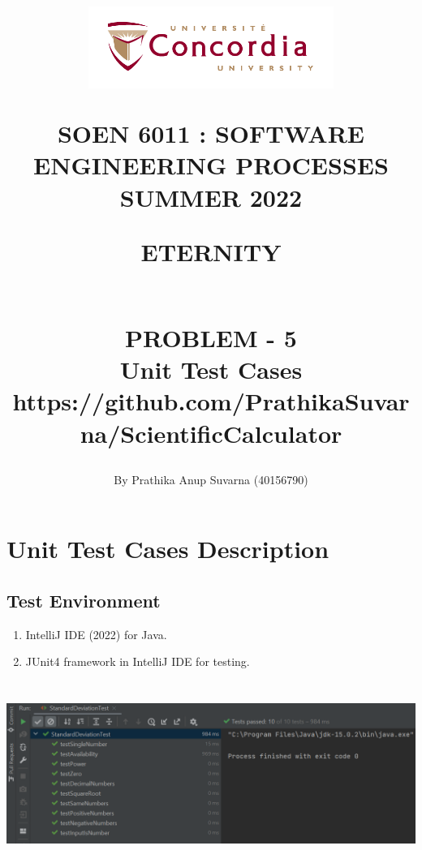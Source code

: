 \documentclass[12pt,letterpaper]{report}
\begin{document}
\title{\begin{figure}[htb]
\begin{center}
\includegraphics[width=8cm]{univ_logo}
\end{center}
\end{figure}SOEN 6011 : SOFTWARE ENGINEERING PROCESSES\\[.5em]
SUMMER 2022\\\vspace*{0.9in}
\begin{Large}
\textbf{ETERNITY} 
\end{Large}
\vspace*{0.7in}
\begin{Large}
\textbf{\\PROBLEM - 5} 
\\Unit Test Cases\\
\small{https://github.com/PrathikaSuvarna/ScientificCalculator}
\end{Large}}
\author{By Prathika Anup Suvarna (40156790)}
\maketitle 
{}
\setcounter{page}{0}

\tableofcontents


\chapter{Unit Test Cases Description}

\section{Test Environment}
\begin{enumerate}
\item IntelliJ IDE (2022) for Java.
\item JUnit4 framework in IntelliJ IDE for testing.
\end{enumerate}

\begin{center}
\includegraphics[width=15cm,height=6cm]{UnitTest}
\end{center}
\end{document}
